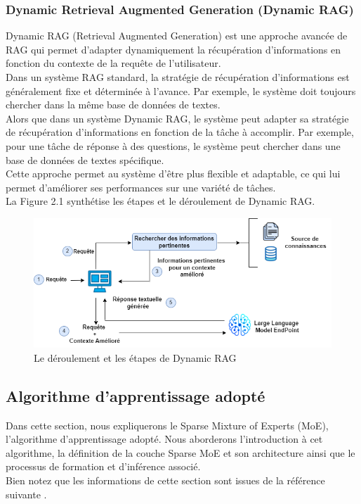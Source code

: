 \subsubsection{Dynamic Retrieval Augmented Generation (Dynamic RAG)}
\justifying
Dynamic RAG (Retrieval Augmented Generation) est une approche avancée de RAG qui permet d'adapter dynamiquement la récupération d'informations en fonction du contexte de la requête de l'utilisateur.\\
Dans un système RAG standard, la stratégie de récupération d'informations est généralement fixe et déterminée à l'avance. Par exemple, le système doit toujours chercher dans la même base de données de textes.\\
Alors que dans un système Dynamic RAG, le système peut adapter sa stratégie de récupération d'informations en fonction de la tâche à accomplir. Par exemple, pour une tâche de réponse à des questions, le système peut chercher dans une base de données de textes spécifique.\\
Cette approche permet au système d'être plus flexible et adaptable, ce qui lui permet d’améliorer ses performances sur une variété de tâches.\\
La Figure 2.1 synthétise les étapes et le déroulement  de Dynamic RAG.

\begin{figure}[H]
    \centering
    \includegraphics[width=\textwidth]{images/chp2/fig1.png}
   \caption{Le déroulement et les étapes de Dynamic RAG}
    \label{fig:deroulement dynamic rag}      
\end{figure}


\subsection{Algorithme d’apprentissage adopté}
\justifying
Dans cette section, nous expliquerons le Sparse Mixture of Experts (MoE), l’algorithme d’apprentissage adopté. Nous aborderons l'introduction à cet algorithme, la définition de la couche Sparse MoE et son architecture ainsi que le processus de formation et d'inférence associé.\\
Bien notez que les informations de cette section sont issues de la référence suivante \cite{moe}.

